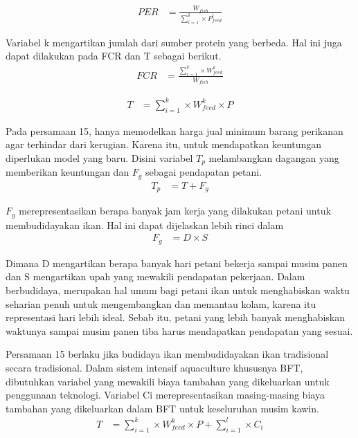 \begin{equation}
    \begin{split}
		PER
		&= \frac{W_{fish}}{\sum_{i=1}^k \times P^i_{feed}}
    \end{split}
\end{equation}

Variabel k mengartikan jumlah dari sumber protein yang berbeda. Hal ini juga dapat dilakukan pada FCR dan T sebagai berikut.
\begin{equation}
    \begin{split}
		FCR
		&= \frac{\sum_{i=1}^k \times W^k_{feed}}{W_{fish}}
    \end{split}
\end{equation}

\begin{equation}
    \begin{split}
		T
		&= \sum_{i=1}^k \times W^k_{feed} \times P
    \end{split}
\end{equation}

Pada persamaan 15, hanya memodelkan harga jual minimum barang perikanan agar terhindar dari kerugian. Karena itu, untuk mendapatkan keuntungan diperlukan model yang baru. Disini variabel $T_p$ melambangkan dagangan yang memberikan keuntungan dan $F_g$ sebagai pendapatan petani.
\begin{equation}
    \begin{split}
		T_p
		&= T + F_g
    \end{split}
\end{equation}

$F_g$ merepresentasikan berapa banyak jam kerja yang dilakukan petani untuk membudidayakan ikan. Hal ini dapat dijelaskan lebih rinci dalam
\begin{equation}
    \begin{split}
		F_g
		&= D \times S
    \end{split}
\end{equation}

Dimana D mengartikan berapa banyak hari petani bekerja sampai musim panen dan S mengartikan upah yang mewakili pendapatan pekerjaan. Dalam berbudidaya, merupakan hal umum bagi petani ikan untuk menghabiskan waktu seharian penuh untuk mengembangkan dan memantau kolam, karena itu representasi hari lebih ideal. Sebab itu, petani yang lebih banyak menghabiskan waktunya sampai musim panen tiba harus mendapatkan pendapatan yang sesuai.

Persamaan 15 berlaku jika budidaya ikan membudidayakan ikan tradisional secara tradisional. Dalam sistem intensif aquaculture khususnya BFT, dibutuhkan variabel yang mewakili biaya tambahan yang dikeluarkan untuk penggunaan teknologi. Variabel Ci merepresentasikan masing-masing biaya tambahan yang dikeluarkan dalam BFT untuk keseluruhan musim kawin.
\begin{equation}
    \begin{split}
		T
		&= \sum_{i=1}^k \times W^k_{feed} \times P + \sum_{i=1}^l \times C_i
    \end{split}
\end{equation}

